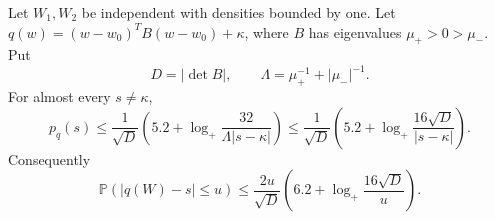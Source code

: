 \begin{theorem}\label{geom:pair}
Let $W_1,W_2$ be independent with densities bounded by one. Let
$q(w)=(w-w_0)^TB(w-w_0)+\kappa$, where $B$ has eigenvalues $\mu_+>0>\mu_-$. Put
\[
 D=|\det B|,\qquad \Lambda=\mu_+^{-1}+|\mu_-|^{-1}.
\]
For almost every $s\ne\kappa$,
\begin{equation}\label{eq:hyperbolic-envelope}
 p_q(s)\le\frac1{\sqrt D}\left(5.2+\log_+\frac{32}{\Lambda|s-\kappa|}\right)
 \le\frac1{\sqrt D}\left(5.2+\log_+\frac{16\sqrt D}{|s-\kappa|}\right).
\end{equation}
Consequently
\begin{equation}\label{eq:hyperbolic-window}
 \mathbb P(|q(W)-s|\le u)
 \le\frac{2u}{\sqrt D}\left(6.2+\log_+\frac{16\sqrt D}{u}\right).
\end{equation}
\end{theorem}
